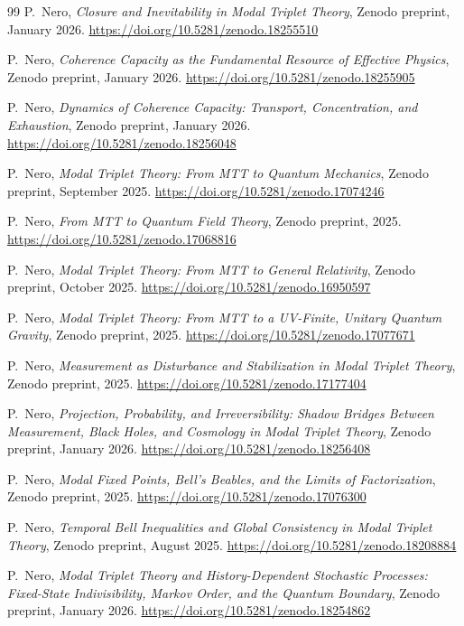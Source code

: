 \documentclass[11pt]{article}
\begin{document}
\begin{thebibliography}{99}
P.~Nero,
\emph{Closure and Inevitability in Modal Triplet Theory},
Zenodo preprint, January 2026.
\url{https://doi.org/10.5281/zenodo.18255510}

P.~Nero,
\emph{Coherence Capacity as the Fundamental Resource of Effective Physics},
Zenodo preprint, January 2026.
\url{https://doi.org/10.5281/zenodo.18255905}

P.~Nero,
\emph{Dynamics of Coherence Capacity: Transport, Concentration, and Exhaustion},
Zenodo preprint, January 2026.
\url{https://doi.org/10.5281/zenodo.18256048}

P.~Nero,
\emph{Modal Triplet Theory: From MTT to Quantum Mechanics},
Zenodo preprint, September 2025.
\url{https://doi.org/10.5281/zenodo.17074246}

P.~Nero,
\emph{From MTT to Quantum Field Theory},
Zenodo preprint, 2025.
\url{https://doi.org/10.5281/zenodo.17068816}

P.~Nero,
\emph{Modal Triplet Theory: From MTT to General Relativity},
Zenodo preprint, October 2025.
\url{https://doi.org/10.5281/zenodo.16950597}

P.~Nero,
\emph{Modal Triplet Theory: From MTT to a UV-Finite, Unitary Quantum Gravity},
Zenodo preprint, 2025.
\url{https://doi.org/10.5281/zenodo.17077671}

P.~Nero,
\emph{Measurement as Disturbance and Stabilization in Modal Triplet Theory},
Zenodo preprint, 2025.
\url{https://doi.org/10.5281/zenodo.17177404}

P.~Nero,
\emph{Projection, Probability, and Irreversibility: Shadow Bridges Between Measurement, Black Holes, and Cosmology in Modal Triplet Theory},
Zenodo preprint, January 2026.
\url{https://doi.org/10.5281/zenodo.18256408}

P.~Nero,
\emph{Modal Fixed Points, Bell's Beables, and the Limits of Factorization},
Zenodo preprint, 2025.
\url{https://doi.org/10.5281/zenodo.17076300}

P.~Nero,
\emph{Temporal Bell Inequalities and Global Consistency in Modal Triplet Theory},
Zenodo preprint, August 2025.
\url{https://doi.org/10.5281/zenodo.18208884}

P.~Nero,
\emph{Modal Triplet Theory and History-Dependent Stochastic Processes:
Fixed-State Indivisibility, Markov Order, and the Quantum Boundary},
Zenodo preprint, January 2026.
\url{https://doi.org/10.5281/zenodo.18254862}

\end{thebibliography}
\end{document}

